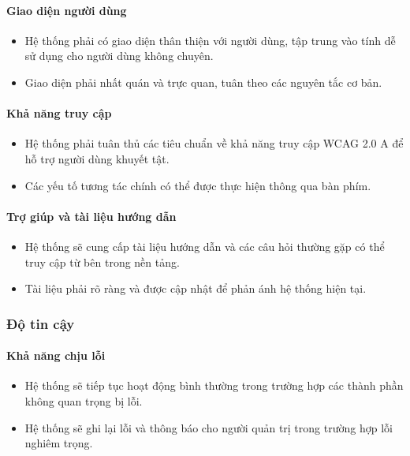 \paragraph{Giao diện người dùng}
\begin{itemize}
    \item Hệ thống phải có giao diện thân thiện với người dùng, tập trung vào tính dễ sử dụng cho người dùng không chuyên.
    \item Giao diện phải nhất quán và trực quan, tuân theo các nguyên tắc cơ bản.
\end{itemize}

\paragraph{Khả năng truy cập}
\begin{itemize}
    \item Hệ thống phải tuân thủ các tiêu chuẩn về khả năng truy cập WCAG 2.0 A để hỗ trợ người dùng khuyết tật.
    \item Các yếu tố tương tác chính có thể được thực hiện thông qua bàn phím.
\end{itemize}

\paragraph{Trợ giúp và tài liệu hướng dẫn}
\begin{itemize}
    \item Hệ thống sẽ cung cấp tài liệu hướng dẫn và các câu hỏi thường gặp có thể truy cập từ bên trong nền tảng.
    \item Tài liệu phải rõ ràng và được cập nhật để phản ánh hệ thống hiện tại.
\end{itemize}

\subsubsection{Độ tin cậy}

\paragraph{Khả năng chịu lỗi}
\begin{itemize}
    \item Hệ thống sẽ tiếp tục hoạt động bình thường trong trường hợp các thành phần không quan trọng bị lỗi.
    \item Hệ thống sẽ ghi lại lỗi và thông báo cho người quản trị trong trường hợp lỗi nghiêm trọng.
\end{itemize}

